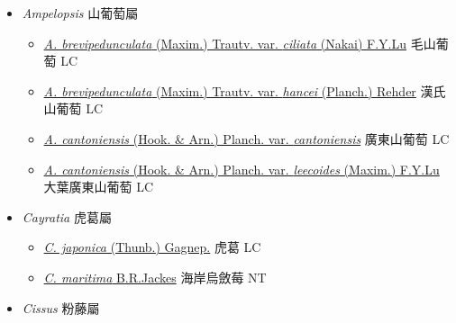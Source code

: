 
  \begin{itemize}
 \item[] \textit{Ampelopsis} 山葡萄屬
                                
  \begin{itemize}
        \item[] \href{http://www.theplantlist.org/tpl1.1/search?q=Ampelopsis+brevipedunculata+var.+ciliata}{\textit{A. brevipedunculata} (Maxim.) Trautv. var. \textit{ciliata} (Nakai) F.Y.Lu}   毛山葡萄   LC
        \item[] \href{http://www.theplantlist.org/tpl1.1/search?q=Ampelopsis+brevipedunculata+var.+hancei}{\textit{A. brevipedunculata} (Maxim.) Trautv. var. \textit{hancei} (Planch.) Rehder}   漢氏山葡萄   LC
        \item[] \href{http://www.theplantlist.org/tpl1.1/search?q=Ampelopsis+cantoniensis+var.+cantoniensis}{\textit{A. cantoniensis} (Hook. \& Arn.) Planch. var. \textit{cantoniensis}}   廣東山葡萄   LC
        \item[] \href{http://www.theplantlist.org/tpl1.1/search?q=Ampelopsis+cantoniensis+var.+leecoides}{\textit{A. cantoniensis} (Hook. \& Arn.) Planch. var. \textit{leecoides} (Maxim.) F.Y.Lu}   大葉廣東山葡萄   LC
  \end{itemize}
 \item[] \textit{Cayratia} 虎葛屬
                                
  \begin{itemize}
        \item[] \href{http://www.theplantlist.org/tpl1.1/search?q=Cayratia+japonica}{\textit{C. japonica} (Thunb.) Gagnep.}   虎葛   LC
        \item[] \href{http://www.theplantlist.org/tpl1.1/search?q=Cayratia+maritima}{\textit{C. maritima} B.R.Jackes}   海岸烏斂莓   NT
  \end{itemize}
 \item[] \textit{Cissus} 粉藤屬
                                

\end{itemize}

